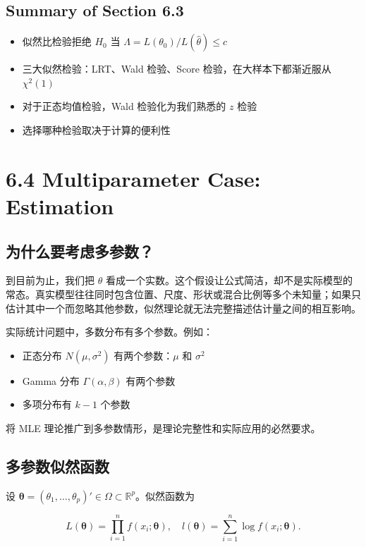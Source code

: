 \subsection{Summary of Section 6.3}

\begin{itemize}
\item 似然比检验拒绝 $H_0$ 当 $\Lambda = L(\theta_0)/L(\widehat{\theta}) \leq c$
\item 三大似然检验：LRT、Wald 检验、Score 检验，在大样本下都渐近服从 $\chi^2(1)$
\item 对于正态均值检验，Wald 检验化为我们熟悉的 $z$ 检验
\item 选择哪种检验取决于计算的便利性
\end{itemize}

\section{6.4 Multiparameter Case: Estimation}\label{sec:6.4}

\subsection{为什么要考虑多参数？}

到目前为止，我们把 $\theta$ 看成一个实数。这个假设让公式简洁，却不是实际模型的常态。真实模型往往同时包含位置、尺度、形状或混合比例等多个未知量；如果只估计其中一个而忽略其他参数，似然理论就无法完整描述估计量之间的相互影响。

实际统计问题中，多数分布有多个参数。例如：

\begin{itemize}
\item 正态分布 $N(\mu, \sigma^2)$ 有两个参数：$\mu$ 和 $\sigma^2$
\item Gamma 分布 $\Gamma(\alpha, \beta)$ 有两个参数
\item 多项分布有 $k-1$ 个参数
\end{itemize}

将 MLE 理论推广到多参数情形，是理论完整性和实际应用的必然要求。

\subsection{多参数似然函数}

设 $\boldsymbol{\theta} = (\theta_1, \ldots, \theta_p)' \in \Omega \subset \mathbb{R}^p$。似然函数为

\[
L(\boldsymbol{\theta}) = \prod_{i=1}^n f(x_i; \boldsymbol{\theta}), \quad l(\boldsymbol{\theta}) = \sum_{i=1}^n \log f(x_i; \boldsymbol{\theta}).
\label{eq:multiparameter-likelihood}
\]

